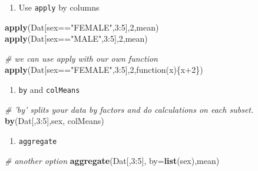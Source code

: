 \documentclass[]{article}
\def\tightlist{}
\newenvironment{Shaded}{\begin{snugshade}}{\end{snugshade}}
\newcommand{\KeywordTok}[1]{\textcolor[rgb]{0.13,0.29,0.53}{\textbf{{#1}}}}
\newcommand{\DataTypeTok}[1]{\textcolor[rgb]{0.13,0.29,0.53}{{#1}}}
\newcommand{\DecValTok}[1]{\textcolor[rgb]{0.00,0.00,0.81}{{#1}}}
\newcommand{\StringTok}[1]{\textcolor[rgb]{0.31,0.60,0.02}{{#1}}}
\newcommand{\CommentTok}[1]{\textcolor[rgb]{0.56,0.35,0.01}{\textit{{#1}}}}
\newcommand{\NormalTok}[1]{{#1}}
\numberwithin{equation}{section}
\begin{document}
\begin{enumerate}
\def\labelenumi{\arabic{enumi}.}
\setcounter{enumi}{1}
\tightlist
\item
  Use \texttt{apply} by columns
\end{enumerate}

\begin{Shaded}
\begin{Highlighting}[]
\KeywordTok{apply}\NormalTok{(Dat[sex==}\StringTok{"FEMALE"}\NormalTok{,}\DecValTok{3}\NormalTok{:}\DecValTok{5}\NormalTok{],}\DecValTok{2}\NormalTok{,mean)}
\KeywordTok{apply}\NormalTok{(Dat[sex==}\StringTok{"MALE"}\NormalTok{,}\DecValTok{3}\NormalTok{:}\DecValTok{5}\NormalTok{],}\DecValTok{2}\NormalTok{,mean)}

\CommentTok{# we can use apply with our own function}
\KeywordTok{apply}\NormalTok{(Dat[sex==}\StringTok{"FEMALE"}\NormalTok{,}\DecValTok{3}\NormalTok{:}\DecValTok{5}\NormalTok{],}\DecValTok{2}\NormalTok{,function(x)\{x}\DecValTok{+2}\NormalTok{\})}
\end{Highlighting}
\end{Shaded}

\begin{enumerate}
\def\labelenumi{\arabic{enumi}.}
\setcounter{enumi}{2}
\tightlist
\item
  \texttt{by} and \texttt{colMeans}
\end{enumerate}

\begin{Shaded}
\begin{Highlighting}[]
\CommentTok{# 'by' splits your data by factors and do calculations on each subset.}
\KeywordTok{by}\NormalTok{(Dat[,}\DecValTok{3}\NormalTok{:}\DecValTok{5}\NormalTok{],sex, colMeans) }
\end{Highlighting}
\end{Shaded}

\begin{enumerate}
\def\labelenumi{\arabic{enumi}.}
\setcounter{enumi}{3}
\tightlist
\item
  \texttt{aggregate}
\end{enumerate}

\begin{Shaded}
\begin{Highlighting}[]
\CommentTok{# another option}
\KeywordTok{aggregate}\NormalTok{(Dat[,}\DecValTok{3}\NormalTok{:}\DecValTok{5}\NormalTok{], }\DataTypeTok{by=}\KeywordTok{list}\NormalTok{(sex),mean) }
\end{Highlighting}
\end{Shaded}
\end{document}
